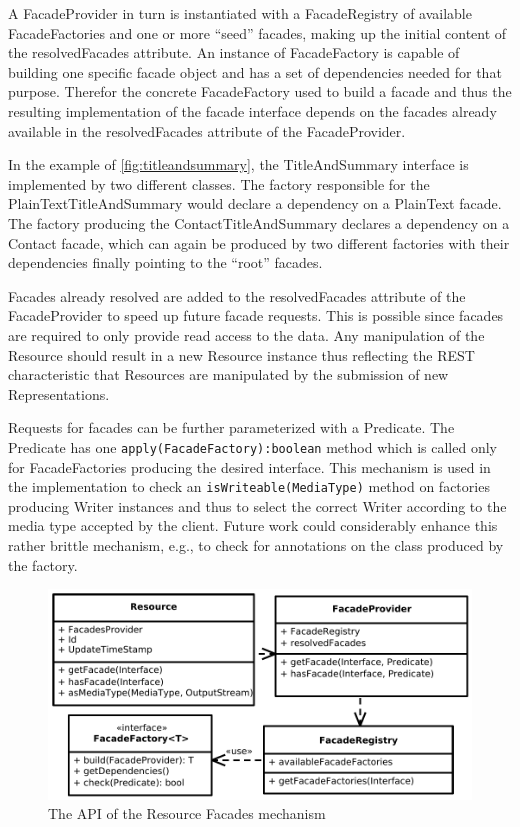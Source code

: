 \documentclass[11pt,a4paper,headsepline,twoside]{scrartcl}		%
\begin{document}
A FacadeProvider in turn is instantiated with a FacadeRegistry of available
FacadeFactories and one or more ``seed'' facades, making up the initial content
of the resolvedFacades attribute. An instance of FacadeFactory is capable of
building one specific facade object and has a set of dependencies needed for
that purpose. Therefor the concrete FacadeFactory used to build a facade and
thus the resulting implementation of the facade interface depends on the facades
already available in the resolvedFacades attribute of the FacadeProvider.

In the example of \autoref{fig:titleandsummary}, the TitleAndSummary interface
is implemented by two different classes. The factory responsible for the
PlainTextTitleAndSummary would declare a dependency on a PlainText facade. The
factory producing the ContactTitleAndSummary declares a dependency on a Contact
facade, which can again be produced by two different factories with their
dependencies finally pointing to the ``root'' facades.

Facades already resolved are added to the resolvedFacades attribute of the
FacadeProvider to speed up future facade requests. This is possible since
facades are required to only provide read access to the data. Any manipulation
of the Resource should result in a new Resource instance thus reflecting the
REST characteristic that Resources are manipulated by the submission of new
Representations.

Requests for facades can be further parameterized with a Predicate. The
Predicate has one \lstinline;apply(FacadeFactory):boolean; method which is
called only for FacadeFactories producing the desired interface. This mechanism
is used in the implementation to check an \lstinline:isWriteable(MediaType):
method on factories producing Writer instances and thus to select the correct
Writer according to the media type accepted by the client. Future work could
considerably enhance this rather brittle mechanism, e.g., to check for
annotations on the class produced by the factory.

\begin{figure}[htb]
  \centering
  \includegraphics[width=1\textwidth]{resourcefacades}

  \caption{The API of the Resource Facades mechanism}
  \label{fig:resourcefacades}
\end{figure}
\end{document}
